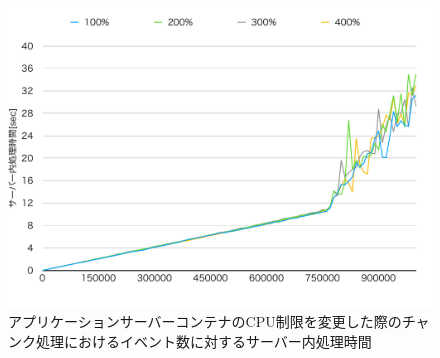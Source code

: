 \documentclass[../../../../../main]{subfiles}
\begin{document}
    \begin{figure}[H]
        \centering
        \includegraphics[width=12cm]{graph}
        \caption{アプリケーションサーバーコンテナのCPU制限を変更した際のチャンク処理におけるイベント数に対するサーバー内処理時間}
        \label{fig:stream-change-app-cpu-limit-server-time-app_1024-db_1_1024}
    \end{figure}
\end{document}

